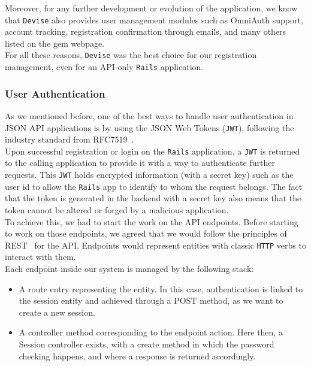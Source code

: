 \documentclass{eplmastersthesis}
\begin{document}
          Moreover, for any further development or evolution of the application,
          we know that \texttt{Devise} also provides user management modules such as
          OmniAuth support, account tracking, registration confirmation
          through emails, and many others listed on the gem webpage.\\

          For all these reasons, \texttt{Devise} was the best choice for our registration management,
          even for an API-only \texttt{Rails} application.

        \subsubsection{User Authentication}

          As we mentioned before, one of the best ways to handle user
          authentication in JSON API applications is by using the JSON Web
          Tokens (\texttt{JWT}), following the industry standard from RFC7519~\cite{rfc7519}.\\

          Upon successful registration or login on the \texttt{Rails} application, a
          \texttt{JWT} is returned to the calling application to provide it with a way
          to authenticate further requests. This \texttt{JWT} holds encrypted
          information (with a secret key) such as the user id to allow the \texttt{Rails}
          app to identify to whom the request belongs. The fact that the token
          is generated in the backend with a secret key also means that the
          token cannot be altered or forged by a malicious application.\\

          To achieve this, we had to start the work on the API endpoints.
          Before starting to work on those endpoints, we agreed that we would
          follow the principles of REST~\cite{rest} for the API. Endpoints would
          represent entities with classic \texttt{HTTP} verbs to interact with them.\\

          Each endpoint inside our system is managed by the following stack:

          \begin{itemize}
            \item A route entry representing the entity. In this case,
            authentication is linked to the session entity and achieved through
            a POST method, as we want to create a new session.
            \item A controller method corresponding to the endpoint action.
            Here then, a Session controller exists, with a create method in
            which the password checking happens, and where a response is
            returned accordingly.
          \end{itemize}
\end{document}
